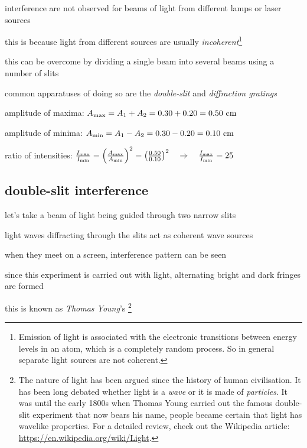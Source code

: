 \cmt interference are not observed for beams of light from different lamps or laser sources

this is because light from different sources are usually \emph{incoherent}\footnote{Emission of light is associated with the electronic transitions between energy levels in an atom, which is a completely random process. So in general separate light sources are not coherent.}

this can be overcome by dividing a single beam into several beams using a number of slits

common apparatuses of doing so are the \emph{double-slit} and \emph{diffraction gratings}


\begin{soln} amplitude of maxima: $A_{\text{max}} = A_1 + A_2 = 0.30 + 0.20 = 0.50 \text{ cm}$

amplitude of minima: $A_{\text{min}} = A_1 - A_2 = 0.30 - 0.20 = 0.10 \text{ cm}$

ratio of intensities: $\frac{I_{\text{max}}}{I_{\text{min}}} = \left( \frac{A_{\text{max}}}{A_{\text{min}}} \right)^2 = \left( \frac{0.50}{0.10} \right)^2 \quad \Rightarrow \quad \frac{I_{\text{max}}}{I_{\text{min}}} = 25$ \end{soln}



\newpage


\subsection{double-slit interference}

let's take a beam of light being guided through two narrow slits

light waves diffracting through the slits act as coherent wave sources

when they meet on a screen, interference pattern can be seen

since this experiment is carried out with light, alternating bright and dark fringes are formed

this is known as \emph{Thomas Young}'s 
\footnote{The nature of light has been argued since the history of human civilisation. It has been long debated whether light is a \emph{wave} or it is made of \emph{particles}. It was until the early 1800s when Thomas Young carried out the famous double-slit experiment that now bears his name, people became certain that light has wavelike properties. For a detailed review, check out the Wikipedia article: \url{https://en.wikipedia.org/wiki/Light}.}

